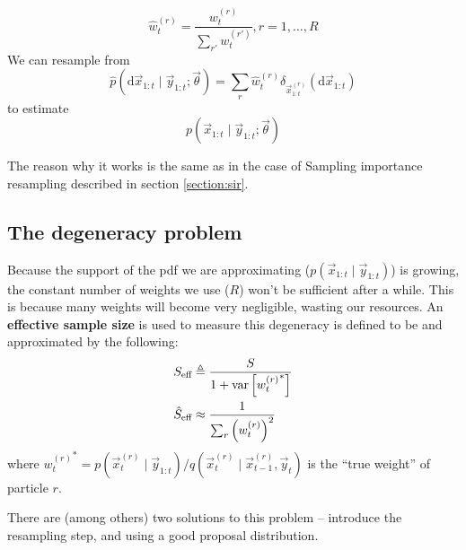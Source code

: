 \begin{algorithmbis}
\begin{algorithmic}[1]
\begin{equation}
                        \hat w_t^{(r)} = \frac{w_t^{(r)}}{\sum_{r'} w_t^{(r')}}, r = 1, \dotsc, R
                    \end{equation}
                \State We can resample from
                    \begin{equation}
                        \hat p(\mathrm d \vec x_{1:t} \mid \vec y_{1:t}; \vec \theta) = \sum_r \hat w_t^{(r)} \delta_{\vec x_{1:t}^{(r)}}(\mathrm d \vec x_{1:t})
                    \end{equation}
                    to estimate
                    \begin{equation}
                        p(\vec x_{1:t} \mid \vec y_{1:t}; \vec \theta)
                    \end{equation}
            \EndFor
        \end{algorithmic}
    \end{algorithmbis}
    The reason why it works is the same as in the case of Sampling importance resampling described in section \ref{section:sir}.

\subsection{The degeneracy problem}
    Because the support of the pdf we are approximating ($p(\vec x_{1:t} \mid \vec y_{1:t})$) is growing, the constant number of weights we use ($R$) won't be sufficient after a while. This is because many weights will become very negligible, wasting our resources. An \textbf{effective sample size} is used to measure this degeneracy is defined to be and approximated by the following:
    \begin{align}
        S_\text{eff}        &\triangleq \frac{S}{1 + \operatorname{\mathrm{var}}\left[{w_t^{(r)}}^\ast\right]} \\
        \hat S_\text{eff}   &\approx \frac{1}{\sum_r \left(w_t^{(r)}\right)^2}\label{eq:Seff}
    \end{align}
    where ${w_t^{(r)}}^\ast = p(\vec x_t^{(r)} \mid \vec y_{1:t}) / q(\vec x_t^{(r)} \mid \vec x_{t-1}^{(r)}, \vec y_t)$ is the ``true weight'' of particle $r$.

    There are (among others) two solutions to this problem -- introduce the resampling step, and using a good proposal distribution.

